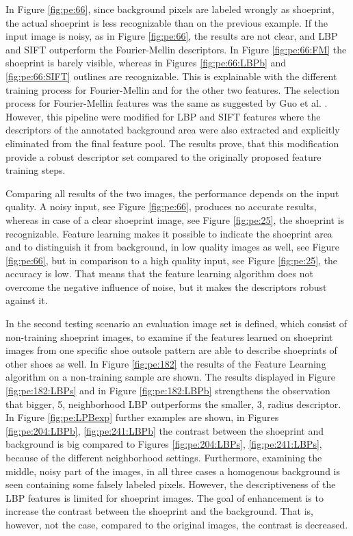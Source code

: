 \documentclass[draft,final]{vutinfth} %
\begin{document}
\par
In Figure \ref{fig:pe:66}, since background pixels are labeled wrongly as shoeprint, the actual shoeprint is less recognizable than on the previous example.
If the input image is noisy, as in Figure \ref{fig:pe:66}, the results are not clear, and LBP and SIFT outperform the Fourier-Mellin descriptors.
In Figure \ref{fig:pe:66:FM} the shoeprint is barely visible, whereas in Figures \ref{fig:pe:66:LBPb} and \ref{fig:pe:66:SIFT} outlines are recognizable.
This is explainable with the different training process for Fourier-Mellin and for the other two features.
The selection process for Fourier-Mellin features was the same as suggested by Guo et al. \cite{guo2012discriminative}.
However, this pipeline were modified for LBP and SIFT features where the descriptors of the annotated background area were also extracted and explicitly eliminated from the final feature pool.
The results prove, that this modification provide a robust descriptor set compared to the originally proposed feature training steps.
\par
Comparing all results of the two images, the performance depends on the input quality.
A noisy input, see Figure \ref{fig:pe:66}, produces no accurate results, whereas in case of a clear shoeprint image, see Figure \ref{fig:pe:25}, the shoeprint is recognizable.
Feature learning makes it possible to indicate the shoeprint area and to distinguish it from background, in low quality images as well,  see Figure \ref{fig:pe:66}, but in comparison to a high quality input, see Figure \ref{fig:pe:25}, the accuracy is low.
That means that the feature learning algorithm does not overcome the negative influence of noise, but it makes the descriptors robust against it.
\par
In the second testing scenario an evaluation image set is defined, which consist of non-training shoeprint images, to examine if the features learned on shoeprint images from one specific shoe outsole pattern are able to describe shoeprints of other shoes as well.
In Figure \ref{fig:pe:182} the results of the Feature Learning algorithm on a non-training sample are shown.
The results displayed in Figure \ref{fig:pe:182:LBPs} and in Figure \ref{fig:pe:182:LBPb} strengthens the observation that bigger, 5, neighborhood LBP outperforms the smaller, 3, radius descriptor.
In Figure \ref{fig:pe:LPBexp} further examples are shown, in Figures \ref{fig:pe:204:LBPb}, \ref{fig:pe:241:LBPb} the contrast between the shoeprint and background is big compared to Figures \ref{fig:pe:204:LBPs}, \ref{fig:pe:241:LBPs}, because of the different neighborhood settings.
Furthermore, examining the middle, noisy part of the images, in all three cases a homogenous background is seen containing some falsely labeled pixels.
However, the descriptiveness of the LBP features is limited for shoeprint images.
The goal of enhancement is to increase the contrast between the shoeprint and the background.
That is, however, not the case, compared to the original images, the contrast is decreased.
\end{document}
